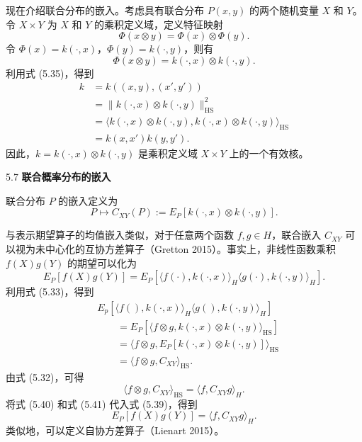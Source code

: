 现在介绍联合分布的嵌入。考虑具有联合分布 $P(x,y)$ 的两个随机变量 $X$ 和 $Y$。令 $X\times Y$ 为 $X$ 和 $Y$ 的乘积定义域，定义特征映射
\[
\Phi(x\otimes y)=\Phi(x)\otimes\Phi(y).
\]
令 $\Phi(x)=k(\cdot,x)$，$\Phi(y)=k(\cdot,y)$，则有
\begin{equation}
\Phi(x\otimes y)=k(\cdot,x)\otimes k(\cdot,y).
\tag{5.36}
\end{equation}
利用式 (5.35)，得到
\begin{equation}
\begin{aligned}
k&=k((x,y),(x',y'))\\
&=\lVert k(\cdot,x)\otimes k(\cdot,y)\rVert_{\mathrm{HS}}^2\\
&=\langle k(\cdot,x)\otimes k(\cdot,y),k(\cdot,x)\otimes k(\cdot,y)\rangle_{\mathrm{HS}}\\
&=k(x,x')k(y,y').
\end{aligned}
\tag{5.37}
\end{equation}
因此，$k=k(\cdot,x)\otimes k(\cdot,y)$ 是乘积定义域 $X\times Y$ 上的一个有效核。

\begin{bookdefinition}{5.7}
\textbf{联合概率分布的嵌入}

联合分布 $P$ 的嵌入定义为
\begin{equation}
P\mapsto C_{XY}(P):=E_P[k(\cdot,x)\otimes k(\cdot,y)].
\tag{5.38}
\end{equation}
\end{bookdefinition}

与表示期望算子的均值嵌入类似，对于任意两个函数 $f,g\in H$，联合嵌入 $C_{XY}$ 可以视为未中心化的互协方差算子（Gretton 2015）。事实上，非线性函数乘积 $f(X)g(Y)$ 的期望可以化为
\begin{equation}
E_P[f(X)g(Y)]
=E_P[\langle f(\cdot),k(\cdot,x)\rangle_H\langle g(\cdot),k(\cdot,y)\rangle_H].
\tag{5.39}
\end{equation}
利用式 (5.33)，得到
\begin{equation}
\begin{aligned}
&E_p[\langle f(),k(\cdot,x)\rangle_H\langle g(),k(\cdot,y)\rangle_H]\\
&\qquad=E_P[\langle f\otimes g,k(\cdot,x)\otimes k(\cdot,y)\rangle_{\mathrm{HS}}]\\
&\qquad=\langle f\otimes g,E_P[k(\cdot,x)\otimes k(\cdot,y)]\rangle_{\mathrm{HS}}\\
&\qquad=\langle f\otimes g,C_{XY}\rangle_{\mathrm{HS}}.
\end{aligned}
\tag{5.40}
\end{equation}
由式 (5.32)，可得
\begin{equation}
\langle f\otimes g,C_{XY}\rangle_{\mathrm{HS}}=\langle f,C_{XY}g\rangle_H.
\tag{5.41}
\end{equation}
将式 (5.40) 和式 (5.41) 代入式 (5.39)，得到
\begin{equation}
E_P[f(X)g(Y)]=\langle f,C_{XY}g\rangle_H.
\tag{5.42}
\end{equation}
类似地，可以定义自协方差算子（Lienart 2015）。

